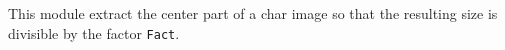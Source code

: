 This module extract the center part of a char image
so that the resulting size is divisible by the factor \verb+Fact+.
